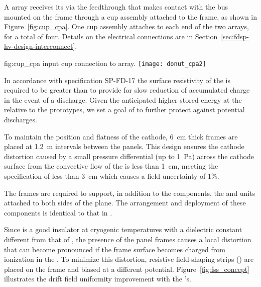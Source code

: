 A  array receives its  via the feedthrough that makes contact with the  bus mounted on the  frame through a cup assembly attached to the frame, as shown in Figure~\ref{fig:cup_cpa}. 
One cup assembly attaches to each end of the two  arrays, for a total of four. Details on the electrical connections are in Section~\ref{sec:fdsp-hv-design-interconnect}.

\begin{dunefigure}{fig:cup_cpa}{ input cup connection to  array.}
\texttt{[image: donut\_cpa2]} %
\end{dunefigure}

In accordance with specification SP-FD-17 %
the surface resistivity of the  is required to be greater than \cathodemegohm to provide for slow reduction of accumulated charge in the event of a discharge.  Given the anticipated higher stored energy at the  
relative to the prototypes, we set a goal of \cathodegigohm to further  protect against potential discharges.  
 
To maintain the position and flatness of the cathode, 
\SI{6}{cm} thick \frfour frames are placed at \SI{1.2}{m} intervals between the  panels. This design ensures the cathode distortion caused by a small pressure differential (up to \SI{1}{Pa}) across the cathode surface from the convective flow of the \lar is less than \SI{1}{cm}, meeting the specification of less than \SI{3}{cm} which causes a field uncertainty of 1\%.


The  frames are required to support, in addition to the  components, the  and  units attached to both sides of the  plane. %
The arrangement and deployment of these components is identical to that in .  

 Since \frfour is a good insulator at cryogenic temperatures with a dielectric constant different from that of \lar, the presence of the  panel frames causes a local \efield distortion that can become pronounced if the frame surface becomes charged 
from ionization in the .  To minimize this distortion, resistive field-shaping strips () are placed on the frame and biased at a different potential.  Figure~\ref{fig:fss_concept} illustrates the drift field uniformity improvement with the 's.


